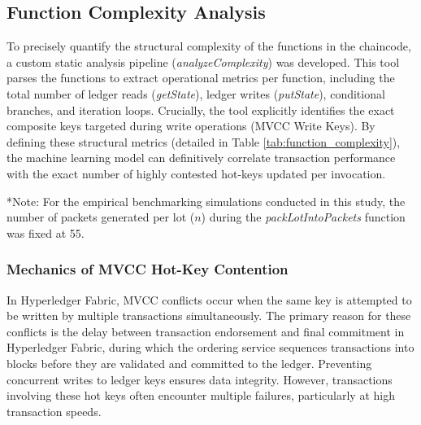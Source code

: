 \documentclass[12pt]{article}
\begin{document}
\subsection{Function Complexity Analysis}

To precisely quantify the structural complexity of the functions in the chaincode, a custom static analysis pipeline (\textit{analyzeComplexity}) was developed. This tool parses the functions to extract operational metrics per function, including the total number of ledger reads (\textit{getState}), ledger writes (\textit{putState}), conditional branches, and iteration loops. Crucially, the tool explicitly identifies the exact composite keys targeted during write operations (MVCC Write Keys). By defining these structural metrics (detailed in Table \ref{tab:function_complexity}), the machine learning model can definitively correlate transaction performance with the exact number of highly contested hot-keys updated per invocation.
\begin{table}[ht]
\centering
\caption{Static Analysis of Smart Contract Function Complexity and MVCC Hot-Keys}
\label{tab:function_complexity}
\end{table}

\vspace{0.2cm}
\noindent \small{*Note: For the empirical benchmarking simulations conducted in this study, the number of packets generated per lot ($n$) during the \textit{packLotIntoPackets} function was fixed at 55.}

 
  \subsubsection{Mechanics of MVCC Hot-Key Contention}
  In Hyperledger Fabric, MVCC conflicts occur when the same key is attempted to be written by multiple transactions simultaneously. The primary reason for these conflicts is the delay between transaction endorsement and final commitment in Hyperledger Fabric, during which the ordering service sequences transactions into blocks before they are validated and committed to the ledger. Preventing concurrent writes to ledger keys ensures data integrity. However, transactions involving these hot keys often encounter multiple failures, particularly at high transaction speeds.
\end{document}

